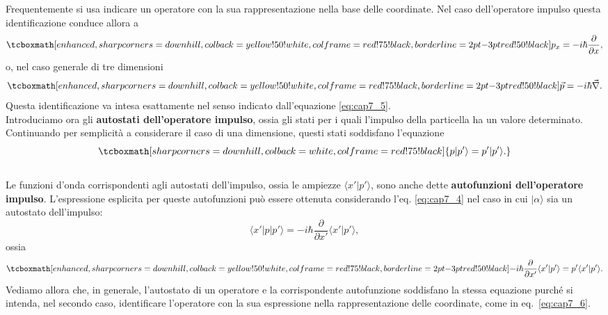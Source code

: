 Frequentemente si usa indicare un operatore con la sua rappresentazione nella base delle coordinate. Nel caso dell'operatore impulso questa identificazione conduce allora a
	\begin{equation}
		\label{eq:cap7_6}
		\tcboxmath[enhanced,sharp corners=downhill ,colback=yellow!50!white,colframe=red!75!black, borderline={2pt}{-3pt}{red!50!black}]{
			p_x= -i\hbar \frac{\partial}{\partial x} ,
			}
	\end{equation}
o, nel caso generale di tre dimensioni
	\begin{equation}
		\tcboxmath[enhanced,sharp corners=downhill ,colback=yellow!50!white,colframe=red!75!black, borderline={2pt}{-3pt}{red!50!black}]{
			\vec{p}= -i\hbar \vec{\nabla}.
			}
	\end{equation}
Questa identificazione va intesa esattamente nel senso indicato dall'equazione \eqref{eq:cap7_5}.\\

Introduciamo ora gli \textbf{autostati dell'operatore impulso}, ossia gli stati per i quali l'impulso della particella ha un valore determinato. Continuando per semplicità a considerare il caso di una dimensione, questi stati soddisfano l'equazione
	\begin{equation}
		\tcboxmath[sharp corners=downhill ,colback=white,colframe=red!75!black]{
			p | p' \rangle = p' | p' \rangle.
			}
	\end{equation}\\
	
Le funzioni d'onda corrispondenti agli autostati dell'impulso, ossia le ampiezze $\langle x' | p' \rangle$, sono anche dette \textbf{autofunzioni dell'operatore impulso}. L'espressione esplicita per queste autofunzioni può essere ottenuta considerando l'eq. \eqref{eq:cap7_4} nel caso in cui $| \alpha \rangle$ sia un autostato dell'impulso:
	\begin{equation}
		\langle x' | p | p' \rangle = -i \hbar \frac{\partial}{\partial x'} \langle x' | p' \rangle,
	\end{equation}
\noindent ossia
	\begin{equation}
		\label{eq:cap7_7}
		\tcboxmath[enhanced,sharp corners=downhill ,colback=yellow!50!white,colframe=red!75!black, borderline={2pt}{-3pt}{red!50!black}]{
			-i \hbar \frac{\partial}{\partial x'} \langle x' | p' \rangle = p' \langle x' | p' \rangle.
			}
	\end{equation}
Vediamo allora che, in generale, l'autostato di un operatore e la corrispondente autofunzione soddisfano la stessa equazione purché si intenda, nel secondo caso, identificare l'operatore con la sua espressione nella rappresentazione delle coordinate, come in eq.~\eqref{eq:cap7_6}.\\

